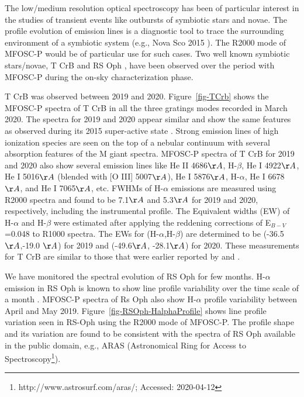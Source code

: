 The low/medium resolution optical spectroscopy has been of particular interest in the studies of transient events like outbursts of symbiotic stars and novae. The profile evolution of emission lines is a diagnostic tool to trace the surrounding environment of a symbiotic system (e.g., Nova Sco 2015 \citep{Srivastava2015}). The R2000 mode of MFOSC-P would be of particular use for such cases. Two well known symbiotic stars/novae, T CrB and RS Oph \citep{Anupama1999}, have been observed over the period with MFOSC-P during the on-sky characterization phase.
\par T CrB was observed between 2019 and 2020. Figure~\ref{fig-TCrb} shows the MFOSC-P spectra of T CrB in all the three gratings modes recorded in March 2020. The spectra for 2019 and 2020 appear similar and show the same features as observed during its 2015 super-active state \citep{Munari2016}. Strong emission lines of high ionization species are seen on the top of a nebular continuum with several absorption features of the M giant spectra. MFOSC-P spectra of T CrB for 2019 and 2020 also show several emission lines like He II 4686$\AA$, H-$\beta$, He I 4922$\AA$, He I 5016$\AA$ (blended with [O III] 5007$\AA$), He I 5876$\AA$, H-$\alpha$, He I 6678$\AA$, and He I 7065$\AA$, etc. FWHMs of H-$\alpha$ emissions are measured using R2000 spectra and found to be 7.1$\AA$ and 5.3$\AA$ for 2019 and 2020, respectively, including the instrumental profile. The Equivalent widths (EW) of H-$\alpha$ and H-$\beta$ were estimated after applying the reddening corrections of E$_{B-V}$=0.048 \citep{Munari2016} to R1000 spectra. The EWs for (H-$\alpha$,H-$\beta$) are determined to be (-36.5$\AA$,-19.0 $\AA$) for 2019 and (-49.6$\AA$, -28.1$\AA$) for 2020. These measurements for T CrB are similar to those that were earlier reported by \cite{Munari2016} and \cite{Ilkiewicz2016}.
\par
We have monitored the spectral evolution of RS Oph for few months. H-$\alpha$ emission in RS Oph is known to show line profile variability over the time scale of a month \citep{Zamanov2005}. MFOSC-P spectra of Rs Oph also show H-$\alpha$ profile variability between April and May 2019. Figure~\ref{fig-RSOph-HalphaProfile} shows line profile variation seen in RS-Oph using the R2000 mode of MFOSC-P. The profile shape and its variation are found to be consistent with the spectra of RS Oph available in the public domain, e.g., ARAS (Astronomical Ring for Access to Spectroscopy\footnote{http://www.astrosurf.com/aras/; Accessed: 2020-04-12}).\\


